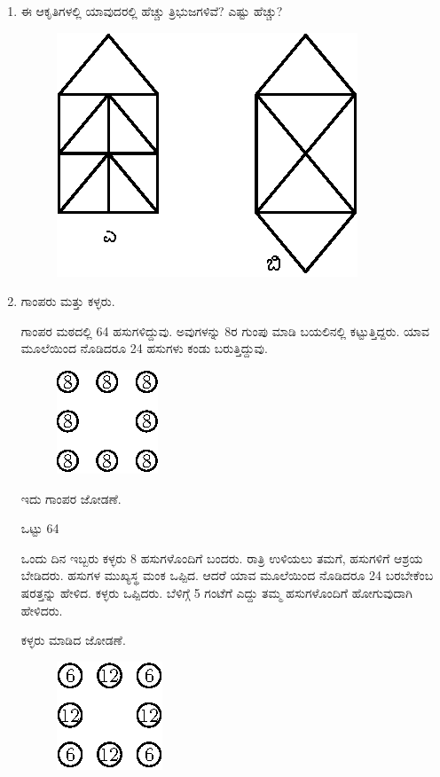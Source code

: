 \begin{enumerate}
\item ಈ ಆಕೃತಿಗಳಲ್ಲಿ ಯಾವುದರಲ್ಲಿ ಹೆಚ್ಚು ತ್ರಿಭುಜಗಳಿವೆ? ಎಷ್ಟು ಹೆಚ್ಚು?
\begin{figure}[H]
\centering
\includegraphics{images/chap12/q27.eps}
\end{figure}

\item ಗಾಂಪರು ಮತ್ತು ಕಳ್ಳರು. 

ಗಾಂಪರ ಮಠದಲ್ಲಿ 64 ಹಸುಗಳಿದ್ದುವು. ಅವುಗಳನ್ನು 8ರ ಗುಂಪು ಮಾಡಿ ಬಯಲಿನಲ್ಲಿ ಕಟ್ಟುತ್ತಿದ್ದರು. ಯಾವ ಮೂಲೆಯಿಂದ ನೊಡಿದರೂ 24 ಹಸುಗಳು ಕಂಡು ಬರುತ್ತಿದ್ದುವು. 
\begin{figure}[H]
\centering
\includegraphics{images/chap12/q28a.eps}
\end{figure}
ಇದು ಗಾಂಪರ ಜೋಡಣೆ.

ಒಟ್ಟು 64


ಒಂದು ದಿನ ಇಬ್ಬರು ಕಳ್ಳರು 8 ಹಸುಗಳೊಂದಿಗೆ ಬಂದರು. ರಾತ್ರಿ ಉಳಿಯಲು ತಮಗೆ, ಹಸುಗಳಿಗೆ ಆಶ್ರಯ ಬೇಡಿದರು. ಹಸುಗಳ ಮುಖ್ಯಸ್ಥ ಮಂಕ ಒಪ್ಪಿದ. ಆದರೆ ಯಾವ ಮೂಲೆಯಿಂದ ನೊಡಿದರೂ 24 ಬರಬೇಕೆಂಬ ಷರತ್ತನ್ನು ಹೇಳಿದ. ಕಳ್ಳರು ಒಪ್ಪಿದರು. ಬೆಳಿಗ್ಗೆ  5 ಗಂಟೆಗೆ ಎದ್ದು ತಮ್ಮ ಹಸುಗಳೊಂದಿಗೆ ಹೋಗುವುದಾಗಿ ಹೇಳಿದರು. 

ಕಳ್ಳರು ಮಾಡಿದ ಜೋಡಣೆ. 
\begin{figure}[H]
\centering
\includegraphics{images/chap12/q28b.eps}
\end{figure}


\end{enumerate}
